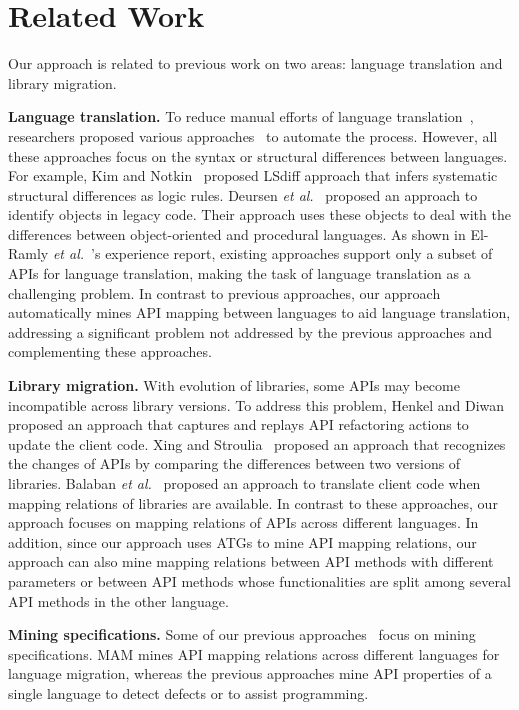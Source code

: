 \section{Related Work}
\label{sec:related}

Our approach is related to previous work on two areas:
language translation and library migration.

\textbf{Language translation.} To reduce manual efforts of language
translation~\cite{samet1981experience}, researchers proposed various
approaches~\cite{hassan2005lightweight,van1999identifying,waters1988program,mossienko2003automated,yasumatsu1995spice, kim2009discovering} to automate the process.
However, all these approaches focus on the syntax or structural differences between
languages. For example, Kim and Notkin~\cite{kim2009discovering} proposed LSdiff
approach that infers systematic structural differences as logic rules.
Deursen \emph{et al.}~\cite{van1999identifying} proposed an approach to identify
objects in legacy code. Their approach uses these objects to deal with the
differences between object-oriented and procedural languages. As
shown in El-Ramly \emph{et al.}~\cite{el2006experiment}'s experience
report, existing approaches support only a subset of APIs for language translation,
making the task of language translation as a challenging problem.
In contrast to previous approaches, our approach automatically mines API mapping between
languages to aid language translation, addressing a significant
problem not addressed by the previous approaches and complementing
these approaches.

\textbf{Library migration.} With evolution of libraries, some APIs
may become incompatible across library versions. To address this
problem, Henkel and Diwan~\cite{henkel2005catchup} proposed an approach that captures
and replays API refactoring actions to update the client code.
Xing and Stroulia~\cite{xing2007api} proposed an approach that
recognizes the changes of APIs by comparing the differences between two
versions of libraries. Balaban \emph{et al.}~\cite{balaban2005refactoring} proposed
an approach to translate client code when mapping relations of libraries are
available. In contrast to these approaches, our approach focuses on
mapping relations of APIs across different languages. In addition, since
our approach uses ATGs to mine API mapping relations, our approach can also
mine mapping relations between API methods with different parameters or between
API methods whose functionalities are split among several API methods in the other language.

\textbf{Mining specifications.} Some of our previous approaches~\cite{zhong09:inferring,zhong09:mapo,thummalapenta09:mining,thummalapenta09:mseqgen,acharya09:mining} focus on mining specifications. MAM mines API mapping relations across different languages for language migration, whereas the previous approaches mine API properties of a single language to detect defects or to assist programming.
